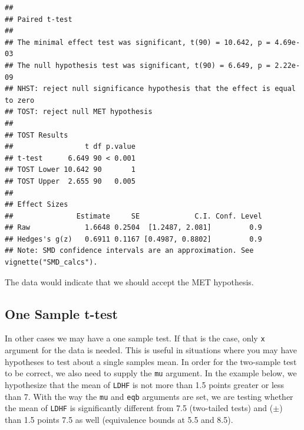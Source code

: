 \documentclass[]{interact}
\theoremstyle{plain}%
\theoremstyle{definition}
\theoremstyle{remark}
\newenvironment{Shaded}{\begin{snugshade}}{\end{snugshade}}
\newcommand{\AttributeTok}[1]{\textcolor[rgb]{0.77,0.63,0.00}{#1}}
\newcommand{\FloatTok}[1]{\textcolor[rgb]{0.00,0.00,0.81}{#1}}
\newcommand{\FunctionTok}[1]{\textcolor[rgb]{0.00,0.00,0.00}{#1}}
\newcommand{\NormalTok}[1]{#1}
\newcommand{\OtherTok}[1]{\textcolor[rgb]{0.56,0.35,0.01}{#1}}
\newcommand{\SpecialCharTok}[1]{\textcolor[rgb]{0.00,0.00,0.00}{#1}}
\newcommand{\StringTok}[1]{\textcolor[rgb]{0.31,0.60,0.02}{#1}}
\begin{document}
\begin{verbatim}
## 
## Paired t-test
## 
## The minimal effect test was significant, t(90) = 10.642, p = 4.69e-03
## The null hypothesis test was significant, t(90) = 6.649, p = 2.22e-09
## NHST: reject null significance hypothesis that the effect is equal to zero 
## TOST: reject null MET hypothesis
## 
## TOST Results 
##                 t df p.value
## t-test      6.649 90 < 0.001
## TOST Lower 10.642 90       1
## TOST Upper  2.655 90   0.005
## 
## Effect Sizes 
##               Estimate     SE             C.I. Conf. Level
## Raw             1.6648 0.2504  [1.2487, 2.081]         0.9
## Hedges's g(z)   0.6911 0.1167 [0.4987, 0.8802]         0.9
## Note: SMD confidence intervals are an approximation. See vignette("SMD_calcs").
\end{verbatim}

The data would indicate that we should accept the MET hypothesis.

\newpage

\hypertarget{one-sample-t-test}{%
\subsection{One Sample t-test}\label{one-sample-t-test}}

In other cases we may have a one sample test. If that is the case, only
\texttt{x} argument for the data is needed. This is useful in situations
where you may have hypotheses to test about a single samples mean. In
order for the two-sample test to be correct, we also need to supply the
\texttt{mu} argument. In the example below, we hypothesize that the mean
of \texttt{LDHF} is not more than 1.5 points greater or less than 7.
With the way the \texttt{mu} and \texttt{eqb} arguments are set, we are
testing whether the mean of \texttt{LDHF} is significantly different
from 7.5 (two-tailed tests) and (\(\pm\)) than 1.5 points 7.5 as well
(equivalence bounds at 5.5 and 8.5).

\begin{Shaded}
\end{Shaded}
\end{document}
